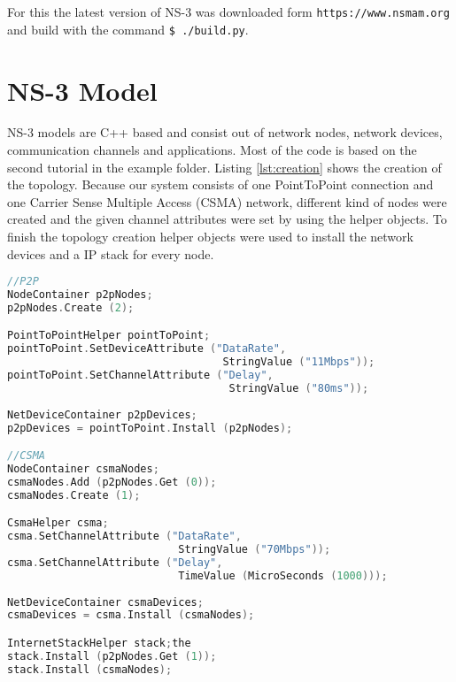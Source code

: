 \documentclass[parskip=full]{scrartcl}
\begin{document}
For this the latest version of NS-3 was downloaded form \verb|https://www.nsmam.org| and build with the command \verb|$ ./build.py|. 


\section{NS-3 Model} \label{sec:procedure}
NS-3 models are C++ based and consist out of network nodes, network devices, communication channels and applications.
Most of the code is based on the second tutorial in the example folder.
Listing \ref{lst:creation} shows the creation of the topology.
Because our system consists of one PointToPoint connection and one Carrier Sense Multiple Access (CSMA) network, different kind of nodes were created and the given channel attributes were set by using the helper objects.
To finish the topology creation helper objects were used to install the network devices and a IP stack for every node.

\begin{lstlisting}[language=c++, frame=single, captionpos=b, caption={Topology creation}, label=lst:creation]
//P2P
NodeContainer p2pNodes;
p2pNodes.Create (2);

PointToPointHelper pointToPoint;
pointToPoint.SetDeviceAttribute ("DataRate", 
                                  StringValue ("11Mbps"));
pointToPoint.SetChannelAttribute ("Delay", 
                                   StringValue ("80ms"));
                                   
NetDeviceContainer p2pDevices;
p2pDevices = pointToPoint.Install (p2pNodes);

//CSMA
NodeContainer csmaNodes;
csmaNodes.Add (p2pNodes.Get (0));
csmaNodes.Create (1);

CsmaHelper csma;
csma.SetChannelAttribute ("DataRate", 
                           StringValue ("70Mbps"));
csma.SetChannelAttribute ("Delay", 
                           TimeValue (MicroSeconds (1000)));
                           
NetDeviceContainer csmaDevices;
csmaDevices = csma.Install (csmaNodes);

InternetStackHelper stack;the
stack.Install (p2pNodes.Get (1));
stack.Install (csmaNodes);
\end{lstlisting}
\end{document}
